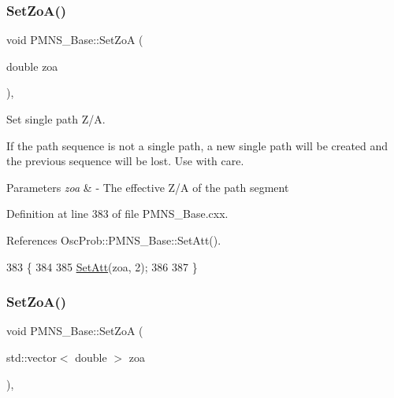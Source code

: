 \subsubsection{\texorpdfstring{Set\+Zo\+A()}{SetZoA()}\hspace{0.1cm}{\footnotesize\ttfamily [1/2]}}
{\footnotesize\ttfamily void P\+M\+N\+S\+\_\+\+Base\+::\+Set\+ZoA (\begin{DoxyParamCaption}\item[{double}]{zoa }\end{DoxyParamCaption})\hspace{0.3cm}{\ttfamily [virtual]}, {\ttfamily [inherited]}}

Set single path Z/A.

If the path sequence is not a single path, a new single path will be created and the previous sequence will be lost. Use with care.


\begin{DoxyParams}{Parameters}
{\em zoa} & -\/ The effective Z/A of the path segment \\
\hline
\end{DoxyParams}


Definition at line 383 of file P\+M\+N\+S\+\_\+\+Base.\+cxx.



References Osc\+Prob\+::\+P\+M\+N\+S\+\_\+\+Base\+::\+Set\+Att().


\begin{DoxyCode}
383                                 \{
384 
385   \hyperlink{classOscProb_1_1PMNS__Base_aba565962a440d14bee7a2a96d2eca2c5}{SetAtt}(zoa, 2);
386 
387 \}
\end{DoxyCode}
\mbox{\label{classOscProb_1_1PMNS__Base_a8495f8a320e1a21965e6a64aec92ad2a}} 
\subsubsection{\texorpdfstring{Set\+Zo\+A()}{SetZoA()}\hspace{0.1cm}{\footnotesize\ttfamily [2/2]}}
{\footnotesize\ttfamily void P\+M\+N\+S\+\_\+\+Base\+::\+Set\+ZoA (\begin{DoxyParamCaption}\item[{std\+::vector$<$ double $>$}]{zoa }\end{DoxyParamCaption})\hspace{0.3cm}{\ttfamily [virtual]}, {\ttfamily [inherited]}}

